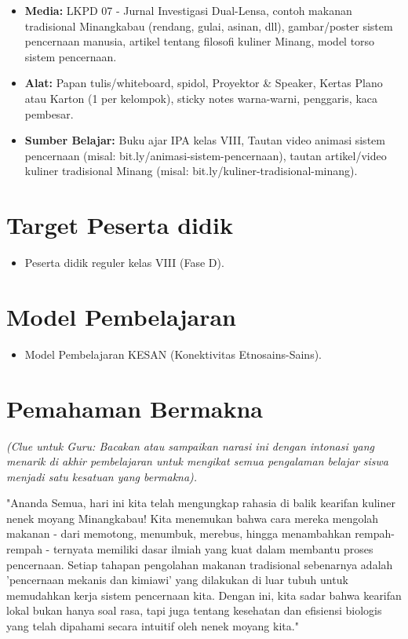 \documentclass[a4paper,12pt]{article}
\begin{document}
\begin{itemize}
\item \textbf{Media:} LKPD 07 - Jurnal Investigasi Dual-Lensa, contoh makanan tradisional Minangkabau (rendang, gulai, asinan, dll), gambar/poster sistem pencernaan manusia, artikel tentang filosofi kuliner Minang, model torso sistem pencernaan.
\item \textbf{Alat:} Papan tulis/whiteboard, spidol, Proyektor \& Speaker, Kertas Plano atau Karton (1 per kelompok), sticky notes warna-warni, penggaris, kaca pembesar.
\item \textbf{Sumber Belajar:} Buku ajar IPA kelas VIII, Tautan video animasi sistem pencernaan (misal: bit.ly/animasi-sistem-pencernaan), tautan artikel/video kuliner tradisional Minang (misal: bit.ly/kuliner-tradisional-minang).
\end{itemize}

\section{Target Peserta didik}

\begin{itemize}
\item Peserta didik reguler kelas VIII (Fase D).
\end{itemize}

\section{Model Pembelajaran}

\begin{itemize}
\item Model Pembelajaran KESAN (Konektivitas Etnosains-Sains).
\end{itemize}

\section{Pemahaman Bermakna}
\textit{(Clue untuk Guru: Bacakan atau sampaikan narasi ini dengan intonasi yang menarik di akhir pembelajaran untuk mengikat semua pengalaman belajar siswa menjadi satu kesatuan yang bermakna).}

\begin{tcolorbox}[sectionbox]
"Ananda Semua, hari ini kita telah mengungkap rahasia di balik kearifan kuliner nenek moyang Minangkabau! Kita menemukan bahwa cara mereka mengolah makanan - dari memotong, menumbuk, merebus, hingga menambahkan rempah-rempah - ternyata memiliki dasar ilmiah yang kuat dalam membantu proses pencernaan. Setiap tahapan pengolahan makanan tradisional sebenarnya adalah 'pencernaan mekanis dan kimiawi' yang dilakukan di luar tubuh untuk memudahkan kerja sistem pencernaan kita. Dengan ini, kita sadar bahwa kearifan lokal bukan hanya soal rasa, tapi juga tentang kesehatan dan efisiensi biologis yang telah dipahami secara intuitif oleh nenek moyang kita."
\end{tcolorbox}
\end{document}
